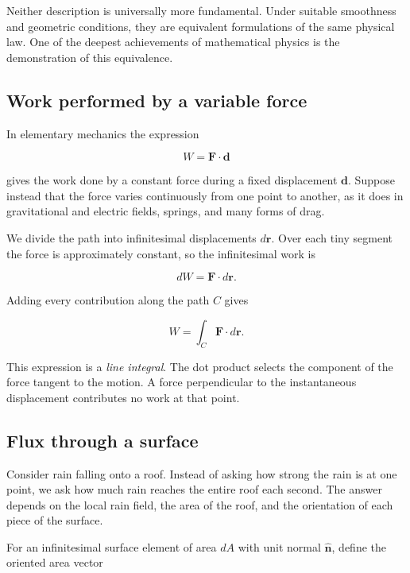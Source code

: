 Neither description is universally more fundamental. Under suitable
smoothness and geometric conditions, they are equivalent formulations of the
same physical law. One of the deepest achievements of mathematical physics is
the demonstration of this equivalence.

\subsection{Work performed by a variable force}

In elementary mechanics the expression

\begin{equation}
  W=\mathbf F\cdot\mathbf d
\end{equation}

gives the work done by a constant force during a fixed displacement
$\mathbf d$. Suppose instead that the force varies continuously from one point
to another, as it does in gravitational and electric fields, springs, and many
forms of drag.

We divide the path into infinitesimal displacements $d\mathbf r$. Over each tiny
segment the force is approximately constant, so the infinitesimal work is

\begin{equation}
  dW=\mathbf F\cdot d\mathbf r.
\end{equation}

Adding every contribution along the path $C$ gives

\begin{equation}
  \boxed{W=\int_C \mathbf F\cdot d\mathbf r.}
\end{equation}

This expression is a \emph{line integral}. The dot product selects the component
of the force tangent to the motion. A force perpendicular to the instantaneous
displacement contributes no work at that point.

\subsection{Flux through a surface}

Consider rain falling onto a roof. Instead of asking how strong the rain is at
one point, we ask how much rain reaches the entire roof each second. The answer
depends on the local rain field, the area of the roof, and the orientation of
each piece of the surface.

For an infinitesimal surface element of area $dA$ with unit normal
$\hat{\mathbf n}$, define the oriented area vector

